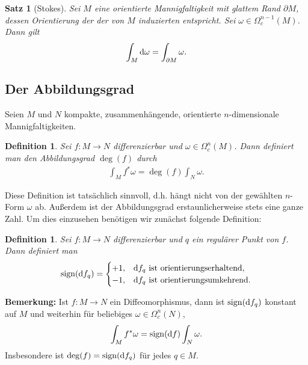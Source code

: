 \documentclass[12pt,a4paper]{article}
\def\sign{\mathrm{sign}}
\newtheorem{Satz}[Lemma]{Satz}
\newtheorem{Definition}[Lemma]{Definition}
\begin{document}
\begin{Satz}[Stokes]
Sei $M$ eine orientierte Mannigfaltigkeit mit glattem Rand $\partial M$, dessen
Orientierung der der von $M$ induzierten entspricht. Sei
$\omega\in\Omega_c^{n-1}(M)$. Dann gilt
\begin{align*}
\int_M \mathrm{d}\omega = \int_{\partial M} \omega.
\end{align*}
\end{Satz}

\subsection{Der Abbildungsgrad}

Seien $M$ und $N$ kompakte, zusammenh\"angende, orientierte $n$-dimensionale
Mannigfaltigkeiten.

\begin{Definition}
Sei $f: M\to N$ differenzierbar und $\omega\in\Omega_c^n(M)$. Dann definiert man
den \emph{Abbildungsgrad} $\deg(f)$ durch
\begin{align*}
\int_M f^*\omega =  \deg(f)\int_N\omega.
\end{align*}
\end{Definition}

Diese Definition ist tats\"achlich sinnvoll, d.h. h\"angt nicht von der gew\"ahlten
$n$-Form $\omega$ ab. Au\ss{}erdem ist der Abbildungsgrad erstaunlicherweise
stets eine ganze Zahl. Um dies einzusehen ben\"otigen wir zun\"achst folgende
Definition:

\begin{Definition}
Sei $f: M\to N$ differenzierbar und $q$ ein regul\"arer Punkt von $f$. Dann
definiert man
\begin{align*}
\sign(\df_q) = 
\begin{cases}
+1, & \df_q \text{ ist orientierungserhaltend},\\
-1, & \df_q \text{ ist orientierungsumkehrend}. 
\end{cases}
\end{align*}
\end{Definition}

\bigskip

{\bf Bemerkung:} Ist $f: M\to N$ ein Diffeomorphismus, dann ist $\sign(\df_q)$
konstant auf $M$ und weiterhin f\"ur beliebiges $\omega\in\Omega_c^n(N)$,
\begin{align*}
\int_M f^*\omega = \sign(\df)\int_N\omega.
\end{align*}
Insbesondere ist $\deg(f) = \sign(\df_q)$ f\"ur jedes $q\in M$.
\end{document}
